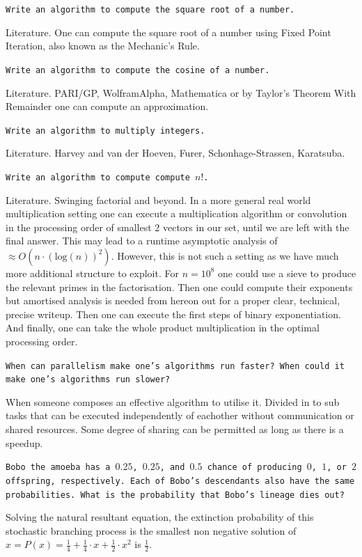 \texttt{Write an algorithm to compute the square root of a number.}

Literature. One can compute the square root of a number using Fixed Point Iteration, also known as the Mechanic's Rule.

\texttt{Write an algorithm to compute the cosine of a number.}

Literature. PARI/GP, WolframAlpha, Mathematica or by Taylor's Theorem With Remainder one can compute an approximation.

\texttt{Write an algorithm to multiply integers.}

Literature. Harvey and van der Hoeven, Furer, Schonhage-Strassen, Karatsuba.

\texttt{Write an algorithm to compute compute $n!$.}

Literature. Swinging factorial and beyond. In a more general real world multiplication setting one can execute a multiplication algorithm or convolution in the processing order of smallest $2$ vectors in our set, until we are left with the final answer. This may lead to a runtime asymptotic analysis of $\approx O(n \cdot (\text{log}(n))^2)$. However, this is not such a setting as we have much more additional structure to exploit. For $n=10^8$ one could use a sieve to produce the relevant primes in the factorisation. Then one could compute their exponents but amortised analysis is needed from hereon out for a proper clear, technical, precise writeup. Then one can execute the first steps of binary exponentiation. And finally, one can take the whole product multiplication in the optimal processing order.

\texttt{When can parallelism make one's algorithms run faster? When could it make one's algorithms run slower?}

When someone composes an effective algorithm to utilise it. Divided in to sub tasks that can be executed independently of eachother without communication or shared resources. Some degree of sharing can be permitted as long as there is a speedup.

\texttt{Bobo the amoeba has a $0.25$, $0.25$, and $0.5$ chance of producing $0$, $1$, or $2$ offspring, respectively. Each of Bobo's descendants also have the same probabilities. What is the probability that Bobo's lineage dies out?}

Solving the natural resultant equation, the extinction probability of this stochastic branching process is the smallest non negative solution of $x=P(x)=\frac{1}{4}+\frac{1}{4}\cdot x+\frac{1}{2} \cdot x^2$ is $\boxed{\frac{1}{2}}$.

